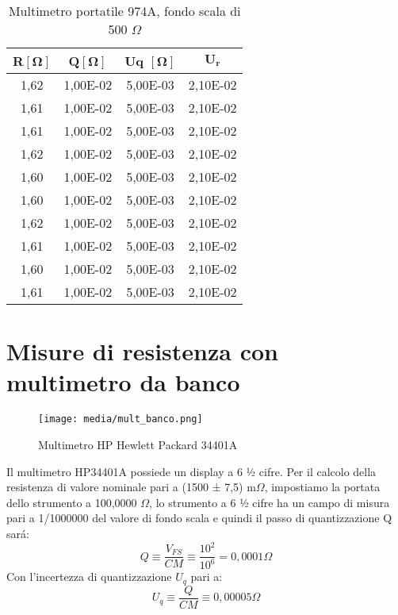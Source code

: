 \begin{table}[!ht]
    \centering
    \begin{tabular}{|c|c|c|c|}
    \hline
        \textbf{R}$\bm{[\Omega]}$ & \textbf{Q}$\bm{[\Omega]}$ & \textbf{Uq} $\bm{[\Omega]}$ & $\bm{U_r}$ \\ \hline
        1,62 & 1,00E-02 & 5,00E-03 & 2,10E-02 \\ \hline
        1,61 & 1,00E-02 & 5,00E-03 & 2,10E-02 \\ \hline
        1,61 & 1,00E-02 & 5,00E-03 & 2,10E-02 \\ \hline
        1,62 & 1,00E-02 & 5,00E-03 & 2,10E-02 \\ \hline
        1,60 & 1,00E-02 & 5,00E-03 & 2,10E-02 \\ \hline
        1,60 & 1,00E-02 & 5,00E-03 & 2,10E-02 \\ \hline
        1,62 & 1,00E-02 & 5,00E-03 & 2,10E-02 \\ \hline
        1,61 & 1,00E-02 & 5,00E-03 & 2,10E-02 \\ \hline
        1,60 & 1,00E-02 & 5,00E-03 & 2,10E-02 \\ \hline
        1,61 & 1,00E-02 & 5,00E-03 & 2,10E-02 \\ \hline
    \end{tabular}
    \caption{Multimetro portatile 974A, fondo scala di 500 $\Omega$}
    \label{tab:mult_port}
\end{table}
\FloatBarrier

\vspace{4cm}
\section{Misure di resistenza con multimetro da banco}
\label{sec:mult}


\begin{figure}[h]
    \centering
    \texttt{[image: media/mult\_banco.png]}
    \caption{Multimetro HP Hewlett Packard 34401A}
    \label{fig:mult_banco}
\end{figure}
\FloatBarrier

Il multimetro HP34401A possiede un display a 6 ½ cifre. 
Per il calcolo della resistenza di valore nominale pari a (1500 ± 7,5) m$\Omega$, impostiamo la portata dello strumento a 100,0000 $\Omega$, lo strumento a 6 ½ cifre ha un campo di misura 
pari a 1/1000000 del valore di fondo scala e quindi il passo di quantizzazione Q sar\'a: 
\begin{equation}
    Q \equiv \frac{V_{FS}}{CM} \equiv \frac{10^2}{10^6} = 0,0001 \Omega
\end{equation}
Con l'incertezza di quantizzazione $U_q$ pari a:
\begin{equation}
    U_q \equiv \frac{Q}{CM} \equiv 0,00005 \Omega
\end{equation}


